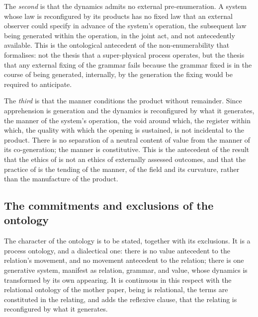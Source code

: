 The \emph{second} is that the dynamics admits no external pre-enumeration. A system whose law is reconfigured by its products has no fixed law that an external observer could specify in advance of the system's operation, the subsequent law being generated within the operation, in the joint act, and not antecedently available. This is the ontological antecedent of the non-enumerability that  formalises: not the thesis that a super-physical process operates, but the thesis that any external fixing of the grammar fails because the grammar fixed is in the course of being generated, internally, by the generation the fixing would be required to anticipate.

The \emph{third} is that the manner conditions the product without remainder. Since apprehension is generation and the dynamics is reconfigured by what it generates, the manner of the system's operation, the void around which, the register within which, the quality with which the opening is sustained, is not incidental to the product. There is no separation of a neutral content of value from the manner of its co-generation; the manner is constitutive. This is the antecedent of the result that the ethics of  is not an ethics of externally assessed outcomes, and that the practice of  is the tending of the manner, of the field and its curvature, rather than the manufacture of the product.

\subsection{The commitments and exclusions of the ontology}
\label{p10:sec:onto-refuses}

The character of the ontology is to be stated, together with its exclusions. It is a process ontology, and a dialectical one: there is no value antecedent to the relation's movement, and no movement antecedent to the relation; there is one generative system, manifest as relation, grammar, and value, whose dynamics is transformed by its own appearing. It is continuous in this respect with the relational ontology of the mother paper, being is relational, the terms are constituted in the relating, and adds the reflexive clause, that the relating is reconfigured by what it generates.

